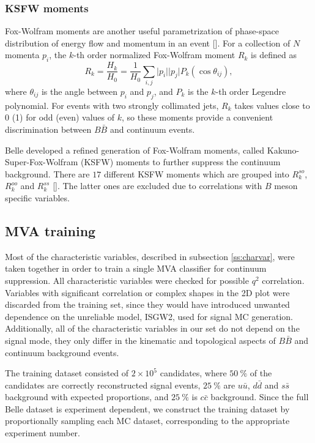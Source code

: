 \documentclass[oneside,a4paper,openany,12pt]{scrbook}
\newcommand {\E}[1]{\times 10^{#1}}
\begin{document}
\subsubsection{KSFW moments}
Fox-Wolfram moments are another useful parametrization of phase-space distribution of energy flow and momentum in an event []. For a collection of $N$ momenta $p_i$, the $k$-th order normalized Fox-Wolfram moment $R_k$ is defined as
\begin{equation}
R_k = \frac{H_k}{H_0} = \frac{1}{H_0} \sum_{i,j} \vert p_i \vert \vert p_j \vert P_k(\cos \theta_{ij}),
\end{equation}
where $\theta_{ij}$ is the angle between $p_i$ and $p_j$, and $P_k$ is the $k$-th order Legendre polynomial. For events with two strongly collimated jets, $R_k$ takes values close to 0 (1) for odd (even) values of $k$, so these moments provide a convenient discrimination between $B \bar B$ and continuum events.

Belle developed a refined generation of Fox-Wolfram moments, called Kakuno-Super-Fox-Wolfram (KSFW) moments to further suppress the continuum background. There are $17$  different KSFW moments which are grouped into $R^{so}_k$, $R^{oo}_k$ and $R^{ss}_k$ []. The latter ones are excluded due to correlations with $B$ meson specific variables.

\subsection{MVA training}
\label{ss:qqmva}
Most of the characteristic variables, described in subsection \ref{ss:charvar}, were taken together in order to train a single MVA classifier for continuum suppression. All characteristic variables were checked for possible $q^2$ correlation. Variables with significant correlation or complex shapes in the 2D plot were discarded from the training set, since they would have introduced unwanted dependence on the unreliable model, ISGW2, used for signal MC generation. Additionally, all of the characteristic variables in our set do not depend on the signal mode, they only differ in the kinematic and topological aspects of $B \bar B$ and continuum background events.

The training dataset consisted of $2\E5$ candidates, where $50~\%$ of the candidates are correctly reconstructed signal events, $25~\%$ are $u \bar u$, $d \bar d$ and $s \bar s$ background with expected proportions, and $25~\%$ is $c \bar c$ background. Since the full Belle dataset is experiment dependent, we construct the training dataset by proportionally sampling each MC dataset, corresponding to the appropriate experiment number.
\end{document}
